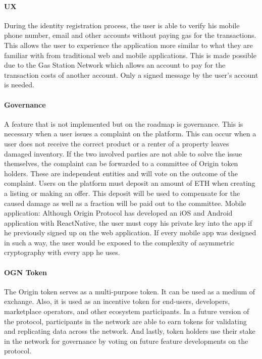 \paragraph{UX}
During the identity registration process, the user is able to verify his mobile phone number, email and other accounts without paying gas for the transactions. This allows the user to experience the application more similar to what they are familiar with from traditional web and mobile applications. This is made possible due to the Gas Station Network which allows an account to pay for the transaction costs of another account. Only a signed message by the user's account is needed. 

\paragraph{Governance}
A feature that is not implemented but on the roadmap is governance. This is necessary when a user issues a complaint on the platform. This can occur when a user does not receive the correct product or a renter of a property leaves damaged inventory. If the two involved parties are not able to solve the issue themselves, the complaint can be forwarded to a committee of Origin token holders. These are independent entities and will vote on the outcome of the complaint. Users on the platform must deposit an amount of ETH when creating a listing or making an offer. This deposit will be used to compensate for the caused damage as well as a fraction will be paid out to the committee.
Mobile application: Although Origin Protocol has developed an iOS and Android application with ReactNative, the user must copy his private key into the app if he previously signed up on the web application. If every mobile app was designed in such a way, the user would be exposed to the complexity of asymmetric cryptography with every app he uses.

\paragraph{OGN Token} The Origin token serves as a multi-purpose token. It can be used as a medium of exchange. Also, it is used as an incentive token for end-users, developers, marketplace operators, and other ecosystem participants. In a future version of the protocol, participants in the network are able to earn tokens for validating and replicating data across the network. And lastly, token holders use their stake in the network for governance by voting on future feature developments on the protocol. 

